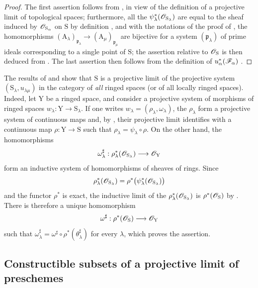 \begin{proof}
The first assertion follows from , in view of the definition of a projective limit of topological spaces; furthermore, all the $\psi_\lambda^*(\mathscr{O}_{\mathrm{S}_\lambda})$ are equal to the sheaf induced by $\mathscr{O}_{\mathrm{S}_\alpha}$ on $\mathrm{S}$ by definition , and with the notations of the proof of , the homomorphisms $(\mathrm{A}_\lambda)_{\mathfrak{p}_\lambda}\to(\mathrm{A}_\mu)_{\mathfrak{p}_\mu}$ are bijective for a system $(\mathfrak{p}_\lambda)$ of prime ideals corresponding to a single point of $\mathrm{S}$; the assertion relative to $\mathscr{O}_\mathrm{S}$ is then deduced from .
The last assertion then follows from the definition of $u_\alpha^*(\mathscr{F}_\alpha)$ .
\end{proof}

\begin{remark}[8.2.14]
\label{IV.8.2.14}
The results of  and  show that $\mathrm{S}$ is a projective limit of the projective system $(\mathrm{S}_\lambda,u_{\lambda\mu})$ in the category of \emph{all} ringed spaces (or of all locally ringed spaces).
Indeed, let $\mathrm{Y}$ be a ringed space, and consider a projective system of morphisms of ringed spaces $w_\lambda:\mathrm{Y}\to\mathrm{S}_\lambda$.
If one writes $w_\lambda=(\rho_\lambda,\omega_\lambda)$, the $\rho_\lambda$ form a projective system of continuous maps and, by , their projective limit identifies with a continuous map $\rho:\mathrm{Y}\to\mathrm{S}$ such that $\rho_\lambda=\psi_\lambda\circ\rho$. On the other hand, the homomorphisms
\[
 \omega_\lambda^\sharp:\rho_\lambda^*(\mathscr{O}_{\mathrm{S}_\lambda})\longrightarrow\mathscr{O}_\mathrm{Y}
\]
form an inductive system of homomorphisms of sheaves of rings. Since
\[
 \rho_\lambda^*(\mathscr{O}_{\mathrm{S}_\lambda})
 =\rho^*\bigl(\psi_\lambda^*(\mathscr{O}_{\mathrm{S}_\lambda})\bigr)
\]
and the functor $\rho^*$ is exact, the inductive limit of the $\rho_\lambda^*(\mathscr{O}_{\mathrm{S}_\lambda})$ is $\rho^*(\mathscr{O}_\mathrm{S})$ by . There is therefore a unique homomorphism
\[
 \omega^\sharp:\rho^*(\mathscr{O}_\mathrm{S})\longrightarrow\mathscr{O}_\mathrm{Y}
\]
such that $\omega_\lambda^\sharp=\omega^\sharp\circ\rho^*(\theta_\lambda^\sharp)$ for every $\lambda$, which proves the assertion.
\end{remark}

\subsection{Constructible subsets of a projective limit of preschemes}
\label{subsection:IV.8.3}

